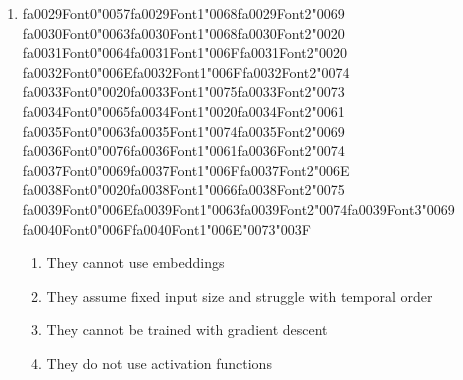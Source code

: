\documentclass[12pt]{article}
\begin{document}
\begin{enumerate}[label=Q\arabic*.]
\begin{enumerate}[label=(\Alph*)]
    \item To prevent the gradients from exploding
    \item To increase the speed of the training process
    \item To allow the model to handle variable-length sequences
\end{enumerate}
\item {\csname fa0029Font0\endcsname\char"0057}{\csname fa0029Font1\endcsname\char"0068}{\csname fa0029Font2\endcsname\char"0069} {\csname fa0030Font0\endcsname\char"0063}{\csname fa0030Font1\endcsname\char"0068}{\csname fa0030Font2\endcsname\char"0020} {\csname fa0031Font0\endcsname\char"0064}{\csname fa0031Font1\endcsname\char"006F}{\csname fa0031Font2\endcsname\char"0020} {\csname fa0032Font0\endcsname\char"006E}{\csname fa0032Font1\endcsname\char"006F}{\csname fa0032Font2\endcsname\char"0074} {\csname fa0033Font0\endcsname\char"0020}{\csname fa0033Font1\endcsname\char"0075}{\csname fa0033Font2\endcsname\char"0073} {\csname fa0034Font0\endcsname\char"0065}{\csname fa0034Font1\endcsname\char"0020}{\csname fa0034Font2\endcsname\char"0061} {\csname fa0035Font0\endcsname\char"0063}{\csname fa0035Font1\endcsname\char"0074}{\csname fa0035Font2\endcsname\char"0069} {\csname fa0036Font0\endcsname\char"0076}{\csname fa0036Font1\endcsname\char"0061}{\csname fa0036Font2\endcsname\char"0074} {\csname fa0037Font0\endcsname\char"0069}{\csname fa0037Font1\endcsname\char"006F}{\csname fa0037Font2\endcsname\char"006E} {\csname fa0038Font0\endcsname\char"0020}{\csname fa0038Font1\endcsname\char"0066}{\csname fa0038Font2\endcsname\char"0075} {\csname fa0039Font0\endcsname\char"006E}{\csname fa0039Font1\endcsname\char"0063}{\csname fa0039Font2\endcsname\char"0074}{\csname fa0039Font3\endcsname\char"0069} {\csname fa0040Font0\endcsname\char"006F}{\csname fa0040Font1\endcsname\char"006E}{\char"0073}{\char"003F}
\begin{enumerate}[label=(\Alph*)]
    \item They cannot use embeddings
    \item They assume fixed input size and struggle with temporal order
    \item They cannot be trained with gradient descent
    \item They do not use activation functions
\end{enumerate}

\end{enumerate}
\end{document}
